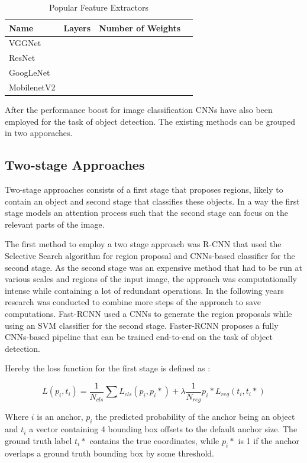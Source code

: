 	\begin{table}[htbp]
		\centering
		\caption{Popular Feature Extractors}
		\begin{tabular}{l|l|l|l}
			Name & Layers & Number of Weights &  \\ \hline
			VGGNet &  &  &  \\ \hline
			ResNet &  &  &  \\ \hline
			GoogLeNet &  &  &  \\ \hline
			MobilenetV2 &  &  &
		\end{tabular}
		\label{tab:cnn-extractors}
	\end{table}

	After the performance boost for image classification \acp{CNN} have also been employed for the task of object detection. The existing methods can be grouped in two apporaches.
	
	
	\subsection{Two-stage Approaches}
	
	Two-stage approaches consists of a first stage that proposes regions, likely to contain an object and second stage that classifies these objects. In a way the first stage models an attention process such that the second stage can focus on the relevant parts of the image.
	
	The first method to employ a two stage approach was R-CNN that used the Selective Search algorithm for region proposal and \acp{CNN}-based classifier for the second stage. As the second stage was an expensive method that had to be run at various scales and regions of the input image, the approach was computationally intense while containing a lot of redundant operations. In the following years research was conducted to combine more steps of the approach to save computations. Fast-RCNN \cite{Ren} used a \acp{CNN} to generate the region proposals while using an SVM classifier for the second stage. Faster-RCNN \cite{Ren2015} proposes a fully \acp{CNN}-based pipeline that can be trained end-to-end on the task of object detection.
	
	Hereby the loss function for the first stage is defined as \cite{Ren}:

	$$
	L({p_i},{t_i}) = \frac{1}{N_{cls}} \sum L_{cls}(p_i,p_i*) + \lambda \frac{1}{N_{reg}} p_i* L_{reg}(t_i,t_i*)
	$$

	Where $i$ is an anchor, $p_i$ the predicted probability of the anchor being an object and $t_i$ a vector containing 4 bounding box offsets to the default anchor size. The ground truth label $t_i*$ contains the true coordinates, while $p_i*$ is 1 if the anchor overlaps a ground truth bounding box by some threshold. 

